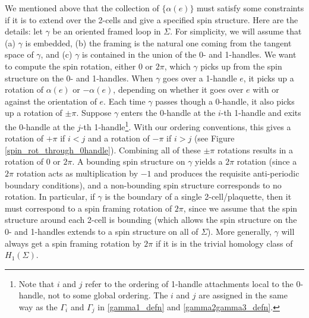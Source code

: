 \documentclass[12pt,a4paper]{article}
\begin{document}
We mentioned above that the collection of $\{\alpha(e)\}$ must satisfy some constraints if it is 
to extend over the 2-cells and give a specified spin structure.
Here are the details:
let $\gamma$ be an oriented framed loop in $\Sigma$.
For simplicity, we will assume that (a) $\gamma$ is embedded, (b) the framing is the natural one coming from the tangent 
space of $\gamma$, and (c) $\gamma$ is contained in the union of the 0- and 1-handles.
We want to compute the spin rotation, either 0 or $2\pi$, which $\gamma$ picks up from the spin structure on the 0- and 1-handles.
When $\gamma$ goes over a 1-handle $e$, it picks up a rotation of $\alpha(e)$ or $-\alpha(e)$, depending on whether it goes over $e$
with or against the orientation of $e$.
Each time $\gamma$ passes though a 0-handle, it also picks up a rotation of $\pm\pi$.
Suppose $\gamma$ enters the 0-handle at the $i$-th 1-handle and exits the 0-handle at the $j$-th 1-handle\footnote{Note that $i$ and $j$ refer to the ordering of 1-handle attachments local to the 0-handle, not to some global ordering. The $i$ and $j$ are assigned in the same way as the $\Gamma_i$ and $\Gamma_j$ in \eqref{gamma1_defn} and \eqref{gamma2gamma3_defn}.}.
With our ordering conventions, this gives a rotation of $+\pi$ if $i<j$ and a rotation of $-\pi$ if $i > j$ (see Figure \ref{spin_rot_through_0handle}).
Combining all of these $\pm\pi$ rotations results in a rotation of 0 or $2\pi$.
A bounding spin structure on $\gamma$ yields a $2\pi$ rotation (since a $2\pi$ rotation acts as 
multiplication by $-1$ and produces the requisite anti-periodic boundary conditions), and a non-bounding 
spin structure corresponds to no rotation.
In particular, if $\gamma$ is the boundary of a single 2-cell/plaquette, then it must correspond to a spin 
framing rotation of $2\pi$, since we assume that the spin structure around each 2-cell is bounding (which 
allows the spin structure on the 0- and 1-handles extends to a spin structure on all of $\Sigma$). 
More generally, $\gamma$ will always get a spin framing rotation by $2\pi$ if it is in the trivial homology 
class of $H_1(\Sigma)$.



\medskip
\end{document}
